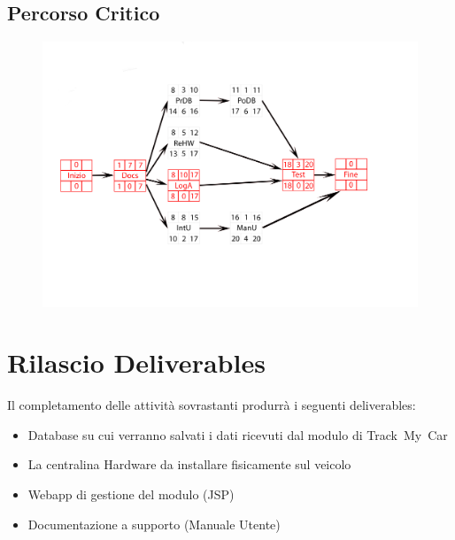\documentclass[a4paper,12pt]{article}
\begin{document}
\subsection{Percorso Critico}
\begin{figure}[htbp]
\centering
\includegraphics[trim={1cm 4.5cm 3.5cm 2.5cm}, clip, scale=0.6]{CPM.png}
\end{figure}

\section{Rilascio Deliverables}
Il completamento delle attività sovrastanti produrrà i seguenti deliverables:
\begin{itemize}
\item Database su cui verranno salvati i dati ricevuti dal modulo di Track~My~Car
\item La centralina Hardware da installare fisicamente sul veicolo
\item Webapp di gestione del modulo (JSP)
\item Documentazione a supporto (Manuale Utente)
\end{itemize}
\pagebreak
\end{document}
